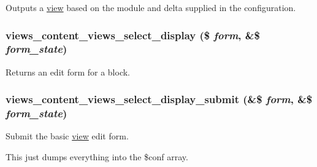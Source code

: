 Outputs a \hyperlink{classview}{view} based on the module and delta supplied in the configuration. \hypertarget{views__content_2plugins_2content__types_2views_8inc_a846334132f0794ebac175d78df1e80bf}{
\subsubsection[{views\_\-content\_\-views\_\-select\_\-display}]{\setlength{\rightskip}{0pt plus 5cm}views\_\-content\_\-views\_\-select\_\-display (\$ {\em form}, \/  \&\$ {\em form\_\-state})}}
\label{views__content_2plugins_2content__types_2views_8inc_a846334132f0794ebac175d78df1e80bf}
Returns an edit form for a block. \hypertarget{views__content_2plugins_2content__types_2views_8inc_a5e2e282d12372207e80bb6a9606133ac}{
\subsubsection[{views\_\-content\_\-views\_\-select\_\-display\_\-submit}]{\setlength{\rightskip}{0pt plus 5cm}views\_\-content\_\-views\_\-select\_\-display\_\-submit (\&\$ {\em form}, \/  \&\$ {\em form\_\-state})}}
\label{views__content_2plugins_2content__types_2views_8inc_a5e2e282d12372207e80bb6a9606133ac}
Submit the basic \hyperlink{classview}{view} edit form.

This just dumps everything into the \$conf array. 